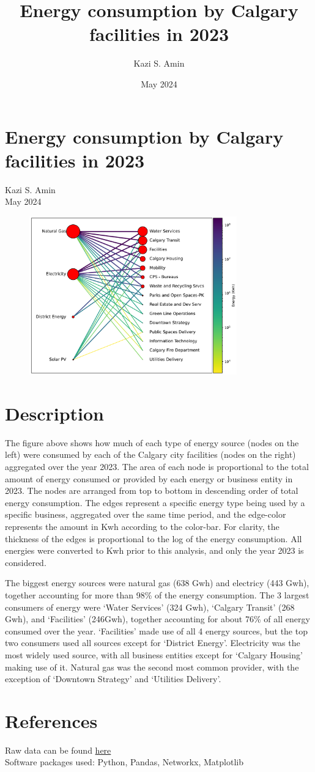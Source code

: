 \documentclass{article}
\title{Energy consumption by Calgary facilities in 2023}
\author{Kazi S. Amin}
\date{May 2024}
\begin{document}
{\centering\section*{Energy consumption by Calgary facilities in 2023}
Kazi S. Amin\\
May 2024\\
}
\begin{figure}
    \centering
    \includegraphics[width=0.8\textwidth]{Data_Analytics_Summer_Position/graph.pdf}
    \label{fig:enter-label}
\end{figure}

\FloatBarrier
\section*{Description}

The figure above shows how much of each type of energy source (nodes on the left) were consumed by each of the Calgary city facilities (nodes on the right) aggregated over the year 2023. The area of each node is proportional to the total amount of energy consumed or provided by each energy or business entity in 2023. The nodes are arranged from top to bottom in descending order of total energy consumption. The edges represent a specific energy type being used by a specific business, aggregated over the same time period, and the edge-color represents the amount in Kwh according to the color-bar. For clarity, the thickness of the edges is proportional to the log of the energy consumption. All energies were converted to Kwh prior to this analysis, and only the year 2023 is considered.

The biggest energy sources were natural gas (638 Gwh) and electricy (443 Gwh), together accounting for more than 98\% of the energy consumption. The 3 largest consumers of energy were `Water Services' (324 Gwh), `Calgary Transit' (268 Gwh), and `Facilities' (246Gwh), together accounting for about 76\% of all energy consumed over the year. `Facilities' made use of all 4 energy sources, but the top two consumers used all sources except for `District Energy'. Electricity was the most widely used source, with all business entities except for `Calgary Housing' making use of it. Natural gas was the second most common provider, with the exception of `Downtown Strategy' and `Utilities Delivery'.

\section*{References}
Raw data can be found \href{https://data.calgary.ca/Environment/Corporate-Energy-Consumption/crbp-innf/about_data}{here} \\
Software packages used: Python, Pandas, Networkx, Matplotlib
\end{document}

